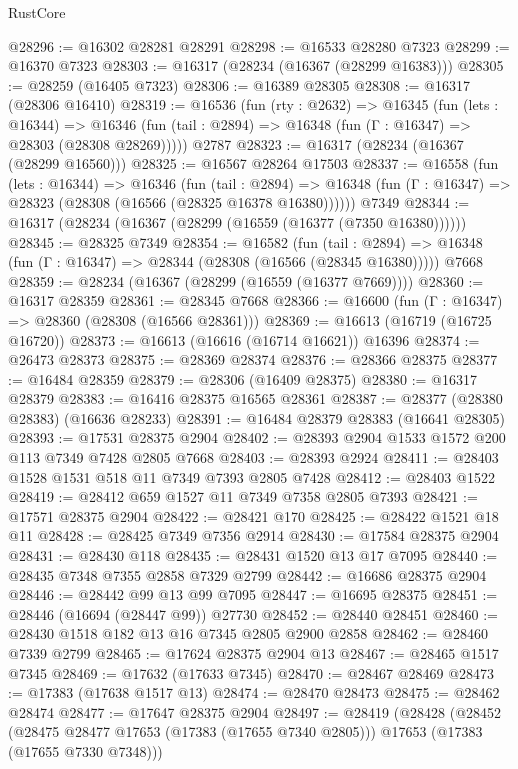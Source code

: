 \begin{lexlean}{RustCore}
\begin{coremodule}
@28296 := @16302 @28281 @28291
@28298 := @16533 @28280 @7323
@28299 := @16370 @7323
@28303 := @16317 (@28234 (@16367 (@28299 @16383)))
@28305 := @28259 (@16405 @7323)
@28306 := @16389 @28305
@28308 := @16317 (@28306 @16410)
@28319 := @16536
    (fun (rty : @2632) =>
    @16345
      (fun (lets : @16344) =>
      @16346 (fun (tail : @2894) => @16348 (fun (Γ : @16347) => @28303 (@28308 @28269)))))
    @2787
@28323 := @16317 (@28234 (@16367 (@28299 @16560)))
@28325 := @16567 @28264 @17503
@28337 := @16558
    (fun (lets : @16344) =>
    @16346
      (fun (tail : @2894) =>
      @16348 (fun (Γ : @16347) => @28323 (@28308 (@16566 (@28325 @16378 @16380))))))
    @7349
@28344 := @16317 (@28234 (@16367 (@28299 (@16559 (@16377 (@7350 @16380))))))
@28345 := @28325 @7349
@28354 := @16582
    (fun (tail : @2894) => @16348 (fun (Γ : @16347) => @28344 (@28308 (@16566 (@28345 @16380)))))
    @7668
@28359 := @28234 (@16367 (@28299 (@16559 (@16377 @7669))))
@28360 := @16317 @28359
@28361 := @28345 @7668
@28366 := @16600 (fun (Γ : @16347) => @28360 (@28308 (@16566 @28361)))
@28369 := @16613 (@16719 (@16725 @16720))
@28373 := @16613 (@16616 (@16714 @16621)) @16396
@28374 := @26473 @28373
@28375 := @28369 @28374
@28376 := @28366 @28375
@28377 := @16484 @28359
@28379 := @28306 (@16409 @28375)
@28380 := @16317 @28379
@28383 := @16416 @28375 @16565 @28361
@28387 := @28377 (@28380 @28383) (@16636 @28233)
@28391 := @16484 @28379 @28383 (@16641 @28305)
@28393 := @17531 @28375 @2904
@28402 := @28393 @2904 @1533 @1572 @200 @113 @7349 @7428 @2805 @7668
@28403 := @28393 @2924
@28411 := @28403 @1528 @1531 @518 @11 @7349 @7393 @2805 @7428
@28412 := @28403 @1522
@28419 := @28412 @659 @1527 @11 @7349 @7358 @2805 @7393
@28421 := @17571 @28375 @2904
@28422 := @28421 @170
@28425 := @28422 @1521 @18 @11
@28428 := @28425 @7349 @7356 @2914
@28430 := @17584 @28375 @2904
@28431 := @28430 @118
@28435 := @28431 @1520 @13 @17 @7095
@28440 := @28435 @7348 @7355 @2858 @7329 @2799
@28442 := @16686 @28375 @2904
@28446 := @28442 @99 @13 @99 @7095
@28447 := @16695 @28375
@28451 := @28446 (@16694 (@28447 @99)) @27730
@28452 := @28440 @28451
@28460 := @28430 @1518 @182 @13 @16 @7345 @2805 @2900 @2858
@28462 := @28460 @7339 @2799
@28465 := @17624 @28375 @2904 @13
@28467 := @28465 @1517 @7345
@28469 := @17632 (@17633 @7345)
@28470 := @28467 @28469
@28473 := @17383 (@17638 @1517 @13)
@28474 := @28470 @28473
@28475 := @28462 @28474
@28477 := @17647 @28375 @2904
@28497 := @28419
    (@28428
      (@28452
        (@28475 @28477 @17653 (@17383 (@17655 @7340 @2805)))
        @17653
        (@17383 (@17655 @7330 @7348)))

\end{coremodule}
\end{lexlean}
